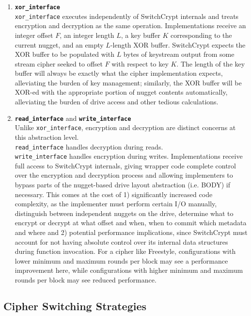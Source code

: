 \begin{enumerate}
   \item \textbf{\texttt{xor\_interface}}\\\texttt{xor\_interface} executes
   independently of SwitchCrypt internals and treats encryption and decryption
   as the same operation. Implementations receive an integer offset $F$, an
   integer length $L$, a key buffer $K$ corresponding to the current nugget, and
   an empty $L$-length XOR buffer. SwitchCrypt expects the XOR buffer to be
   populated with $L$ bytes of keystream output from some stream cipher seeked
   to offset $F$ with respect to key $K$. The length of the key buffer will
   always be exactly what the cipher implementation expects, alleviating the
   burden of key management; similarly, the XOR buffer will be XOR-ed with the
   appropriate portion of nugget contents automatically, alleviating the burden
   of drive access and other tedious calculations. \\
   \item \textbf{\texttt{read\_interface}} and
   \textbf{\texttt{write\_interface}}\\
   Unlike \texttt{xor\_interface}, encryption and decryption are distinct
   concerns at this abstraction level. \\\texttt{read\_interface} handles
   decryption during reads. \\\texttt{write\_interface} handles encryption
   during writes. Implementations receive full access to SwitchCrypt internals,
   giving wrapper code complete control over the encryption and decryption
   process and allowing implementers to bypass parts of the nugget-based drive
   layout abstraction (i.e. BODY) if necessary. This comes at the cost of 1)
   significantly increased code complexity, as the implementer must perform
   certain I/O manually, distinguish between independent nuggets on the drive,
   determine what to encrypt or decrypt at what offset and when, when to commit
   which metadata and where and 2) potential performance implications, since
   SwitchCrypt must account for not having absolute control over its internal
   data structures during function invocation. For a cipher like Freestyle,
   configurations with lower minimum and maximum rounds per block may see a
   performance improvement here, while configurations with higher minimum and
   maximum rounds per block may see reduced performance.
\end{enumerate}

\subsection{Cipher Switching Strategies} \label{subsec:strategies}

